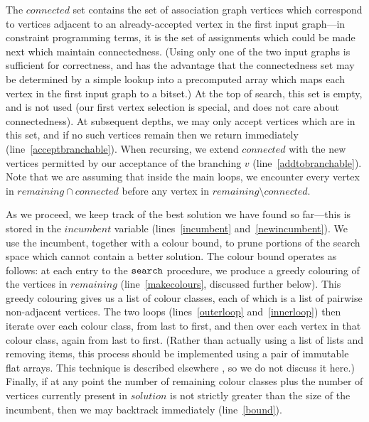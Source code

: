 \documentclass{llncs}
\newcommand{\lineref}[1]{line~\ref{#1}}
\newcommand{\twolinesref}[2]{lines~\ref{#1} and~\ref{#2}}
\begin{document}
The $\mathit{connected}$ set contains the set of association graph vertices which correspond to
vertices adjacent to an already-accepted vertex in the first input graph---in constraint programming terms, it is the
set of assignments which could be made next which maintain connectedness. (Using only one of the two
input graphs is sufficient for correctness, and has the advantage that the connectedness set
may be determined by a simple lookup into a precomputed array which maps each vertex in
the first input graph to a bitset.) At the top of search, this set is empty, and is not used (our
first vertex selection is special, and does not care about connectedness). At subsequent depths, we
may only accept vertices which are in this set, and if no such vertices remain then we return
immediately (\lineref{acceptbranchable}). When recursing, we extend $\mathit{connected}$ with the
new vertices permitted by our acceptance of the branching $v$ (\lineref{addtobranchable}). Note that
we are assuming that inside the main loops, we encounter every vertex in $\mathit{remaining} \cap
\mathit{connected}$ before any vertex in $\mathit{remaining} \setminus \mathit{connected}$.

As we proceed, we keep track of the best solution we have found so far---this is stored in the
$\mathit{incumbent}$ variable (\twolinesref{incumbent}{newincumbent}). We use the incumbent,
together with a colour bound, to prune portions of the search space which cannot contain a better
solution. The colour bound operates as follows: at each entry to the $\FuncSty{search}$ procedure,
we produce a greedy colouring of the vertices in $\mathit{remaining}$ (\lineref{makecolours},
discussed further below). This greedy colouring gives us a list of colour classes, each of which is
a list of pairwise non-adjacent vertices. The two loops (\twolinesref{outerloop}{innerloop}) then
iterate over each colour class, from last to first, and then over each vertex in that colour class,
again from last to first.  (Rather than actually using a list of lists and removing items, this
process should be implemented using a pair of immutable flat arrays. This technique is described
elsewhere \cite{DBLP:conf/cp/McCreeshP14}, so we do not discuss it here.) Finally, if at any point
the number of remaining colour classes plus the number of vertices currently present in
$\mathit{solution}$ is not strictly greater than the size of the incumbent, then we may backtrack
immediately (\lineref{bound}).
\end{document}

